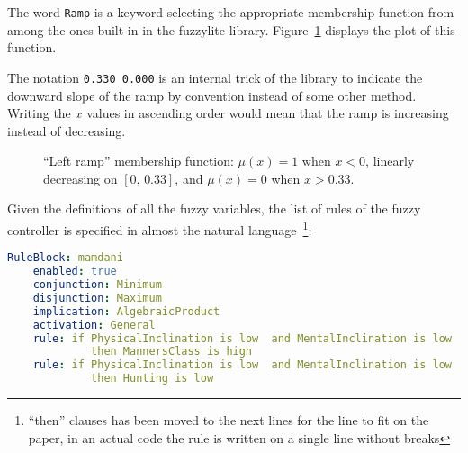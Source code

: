 \documentclass[12pt, a4paper]{report}
\begin{document}
  The word \texttt{Ramp} is a keyword selecting the appropriate membership function from among the ones built-in in the fuzzylite library.
  Figure~\ref{fig:left-ramp} displays the plot of this function.
  
  The notation \texttt{0.330 0.000} is an internal trick of the library to indicate the downward slope of the ramp by convention instead of some other method.
  Writing the $x$ values in ascending order would mean that the ramp is increasing instead of decreasing.
  
  \begin{figure}[htbp]
  	\centering
  	\caption{``Left ramp'' membership function: $\mu(x)=1$ when $x<0$, linearly decreasing on $[0,\,0.33]$, and $\mu(x)=0$ when $x>0.33$.}
  	\label{fig:left-ramp}
  \end{figure}
  
  Given the definitions of all the fuzzy variables, the list of rules of the fuzzy controller is specified in almost the natural language~\footnote{``then'' clauses has been moved to the next lines for the line to fit on the paper, in an actual code the rule is written on a single line without breaks}:

  \begin{lstlisting}[language=yaml]
  RuleBlock: mamdani
    enabled: true
    conjunction: Minimum
    disjunction: Maximum
    implication: AlgebraicProduct
    activation: General
    rule: if PhysicalInclination is low  and MentalInclination is low
    	     then MannersClass is high
    rule: if PhysicalInclination is low  and MentalInclination is low 
    	     then Hunting is low
  \end{lstlisting}
\end{document}
